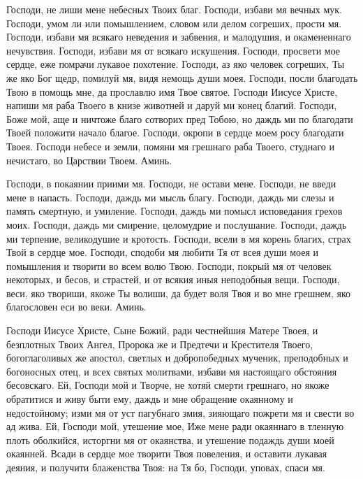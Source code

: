 \begin{mymulticols}

Господи, не лиши мене небесных Твоих благ.
Господи, избави мя вечных мук.
Господи, умом ли или помышлением, словом или делом согреших, прости мя.
Господи, избави мя всякаго неведения и забвения, и малодушия, и окамененнаго нечувствия.
Господи, избави мя от всякаго искушения.
Господи, просвети мое сердце, еже помрачи лукавое похотение.
Господи, аз яко человек согреших, Ты же яко Бог щедр, помилуй мя, видя немощь души моея.
Господи, посли благодать Твою в помощь мне, да прославлю имя Твое святое.
Господи Иисусе Христе, напиши мя раба Твоего в книзе животней и даруй ми конец благий.
Господи, Боже мой, аще и ничтоже благо сотворих пред Тобою, но даждь ми по благодати Твоей положити начало благое.
Господи, окропи в сердце моем росу благодати Твоея.
Господи небесе и земли, помяни мя грешнаго раба Твоего, студнаго и нечистаго, во Царствии Твоем. Аминь.

Господи, в покаянии приими мя.
Господи, не остави мене.
Господи, не введи мене в напасть.
Господи, даждь ми мысль благу.
Господи, даждь ми слезы и память смертную, и умиление.
Господи, даждь ми помысл исповедания грехов моих.
Господи, даждь ми смирение, целомудрие и послушание.
Господи, даждь ми терпение, великодушие и кротость.
Господи, всели в мя корень благих, страх Твой в сердце мое.
Господи, сподоби мя любити Тя от всея души моея и помышления и творити во всем волю Твою.
Господи, покрый мя от человек некоторых, и бесов, и страстей, и от всякия иныя неподобныя вещи.
Господи, веси, яко твориши, якоже Ты волиши, да будет воля Твоя и во мне грешнем, яко благословен еси во веки. Аминь.


Господи Иисусе Христе, Сыне Божий, ради честнейшия Матере Твоея, и безплотных Твоих Ангел, Пророка же и Предтечи и Крестителя Твоего, богоглаголивых же апостол, светлых и добропобедных мученик, преподобных и богоносных отец, и всех святых молитвами, избави мя настоящаго обстояния бесовскаго. Ей, Господи мой и Творче, не хотяй смерти грешнаго, но якоже обратитися и живу быти ему, даждь и мне обращение окаянному и недостойному; изми мя от уст пагубнаго змия, зияющаго пожрети мя и свести во ад жива. Ей, Господи мой, утешение мое, Иже мене ради окаяннаго в тленную плоть оболкийся, исторгни мя от окаянства, и утешение подаждь души моей окаянней. Всади в сердце мое творити Твоя повеления, и оставити лукавая деяния, и получити блаженства Твоя: на Тя бо, Господи, уповах, спаси мя.


\end{mymulticols}
